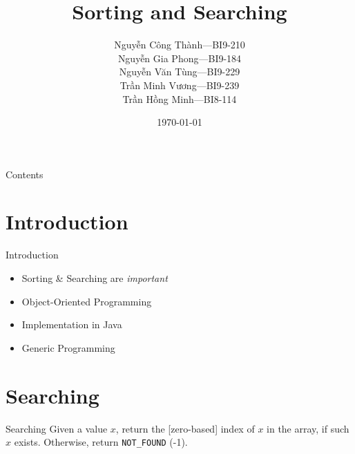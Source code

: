 \documentclass[pdf]{beamer}
\title[Sort \& Search]{Sorting and Searching}
\author[Group 11]{Nguyễn Công Thành---BI9-210\\
                  Nguyễn Gia Phong---BI9-184\\
                  Nguyễn Văn Tùng---BI9-229\\
                  Trần Minh Vương---BI9-239\\
                  Trần Hồng Minh---BI8-114}
\institute{University of Science and Technology of Hà Nội}
\date{\selectlanguage{english}\today}
\begin{document}
\frame{\titlepage}
\begin{frame}{Contents}
  \tableofcontents
\end{frame}

\section{Introduction}
\begin{frame}{Introduction}\Large
  \begin{itemize}
    \item Sorting \& Searching are \emph{important}
    \item Object-Oriented Programming
    \item Implementation in Java
    \item Generic Programming
  \end{itemize}
\end{frame}

\section{Searching}
\begin{frame}[fragile]{Searching}\Large
  Given a value $x$, return the [zero-based] index of $x$ in the array,
  if such $x$ exists.  Otherwise, return \verb|NOT_FOUND| (-1).
\end{frame}
\end{document}
